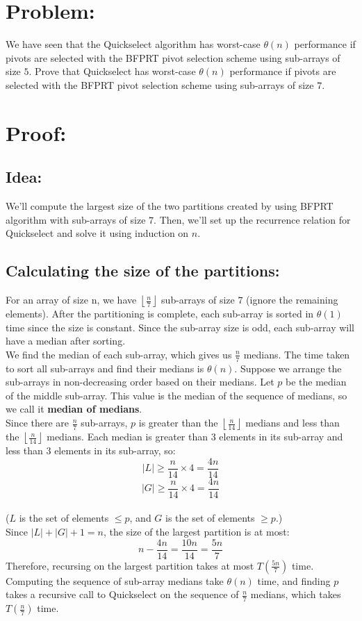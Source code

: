 \documentclass[12pt, b5paper]{article}
\newcommand{\floor}[1]{\left\lfloor #1 \right\rfloor}
\begin{document}
\section*{Problem:}
We have seen that the Quickselect algorithm has worst-case $\theta(n)$ performance if pivots are 
selected with the BFPRT pivot selection scheme using sub-arrays of size $5$. Prove that Quickselect 
has worst-case $\theta(n)$ performance if pivots are selected with the BFPRT pivot selection scheme 
using sub-arrays of size $7$.
\section*{Proof:}
\subsection*{Idea: }
We'll compute the largest size of the two partitions created by using BFPRT algorithm with sub-arrays of size $7$. 
Then, we'll set up the recurrence relation for Quickselect and solve it using induction on $n$. 
\subsection*{Calculating the size of the partitions: }
For an array of size n, we have $\floor{\frac{n}{7}}$ sub-arrays of size $7$ (ignore the 
remaining elements). After the partitioning is complete, each sub-array is sorted in $\theta(1)$ time 
since the size is constant. Since the sub-array size is odd, each sub-array will have a median 
after sorting.\\
\newline
We find the median of each sub-array, which gives us $\frac{n}{7}$ medians. The time taken to sort 
all sub-arrays and find their medians is $\theta(n)$. Suppose we arrange the sub-arrays in 
non-decreasing order based on their medians. Let $p$ be the median of the middle sub-array. This value 
is the median of the sequence of medians, so we call it \textbf{median of medians}. \\
\newline
Since there are $\frac{n}{7}$ sub-arrays, $p$ is greater than the $\floor{\frac{n}{14}}$ medians and 
less than the $\floor{\frac{n}{14}}$ medians. Each median is greater than $3$ elements in its sub-array 
and less than $3$ elements in its sub-array, so:
$$|L| \geq \frac{n}{14} \times 4 = \frac{4n}{14}$$
$$|G| \geq \frac{n}{14} \times 4 = \frac{4n}{14}$$\\
($L$ is the set of elements $\leq p$, and $G$ is the set of elements $\geq p$.) \\
\newline
Since $|L| + |G| + 1 = n$, the size of the largest partition is at most:
$$n - \frac{4n}{14} = \frac{10n}{14} = \frac{5n}{7}$$
Therefore, recursing on the largest partition takes at most $T\left(\frac{5n}{7}\right)$ time. \\
\newline
Computing the sequence of sub-array medians take $\theta(n)$ time, and finding $p$ takes a recursive 
call to Quickselect on the sequence of
$\frac{n}{7}$ medians, which takes $T\left(\frac{n}{7}\right)$ time.
\end{document}
